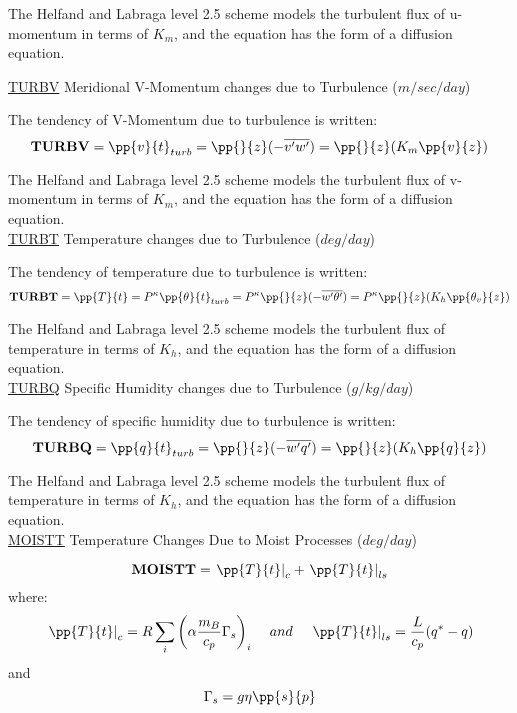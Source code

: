 \noindent
The Helfand and Labraga level 2.5 scheme models the turbulent
flux of u-momentum in terms of $K_m$, and the equation has the form of a diffusion
equation.
 
\noindent
{ \underline {TURBV}  Meridional V-Momentum changes due to Turbulence ($m/sec/day$) }
 
\noindent
The tendency of V-Momentum due to turbulence is written:
\[
{\bf TURBV} = {\pp{v}{t}}_{turb} = {\pp{}{z} }{(- \overline{v^{\prime}w^{\prime}})}
 = {\pp{}{z} }{(K_m \pp{v}{z})}
\]

\noindent
The Helfand and Labraga level 2.5 scheme models the turbulent
flux of v-momentum in terms of $K_m$, and the equation has the form of a diffusion
equation.
\\
 
\noindent
{ \underline {TURBT}  Temperature changes due to Turbulence ($deg/day$) }
 
\noindent
The tendency of temperature due to turbulence is written:
\[
{\bf TURBT} = {\pp{T}{t}} = P^{\kappa}{\pp{\theta}{t}}_{turb} = 
P^{\kappa}{\pp{}{z} }{(- \overline{w^{\prime}\theta^{\prime}})}
 = P^{\kappa}{\pp{}{z} }{(K_h \pp{\theta_v}{z})}
\]

\noindent
The Helfand and Labraga level 2.5 scheme models the turbulent
flux of temperature in terms of $K_h$, and the equation has the form of a diffusion
equation.
\\
 
\noindent
{ \underline {TURBQ}  Specific Humidity changes due to Turbulence ($g/kg/day$) }
 
\noindent
The tendency of specific humidity due to turbulence is written:
\[
{\bf TURBQ} = {\pp{q}{t}}_{turb} = {\pp{}{z} }{(- \overline{w^{\prime}q^{\prime}})}
 = {\pp{}{z} }{(K_h \pp{q}{z})}
\]

\noindent
The Helfand and Labraga level 2.5 scheme models the turbulent
flux of temperature in terms of $K_h$, and the equation has the form of a diffusion
equation.
\\
 
\noindent
{ \underline {MOISTT} Temperature Changes Due to Moist Processes ($deg/day$) } 

\noindent
\[
{\bf MOISTT} = \left. {\pp{T}{t}}\right|_{c} + \left. {\pp{T}{t}} \right|_{ls}
\]
where:
\[
\left.{\pp{T}{t}}\right|_{c} = R \sum_i \left( \alpha { m_B \over c_p} \Gamma_s \right)_i 
\hspace{.4cm} and 
\hspace{.4cm} \left.{\pp{T}{t}}\right|_{ls} = {L \over c_p } (q^*-q)
\]
and
\[
\Gamma_s = g \eta \pp{s}{p}
\]

